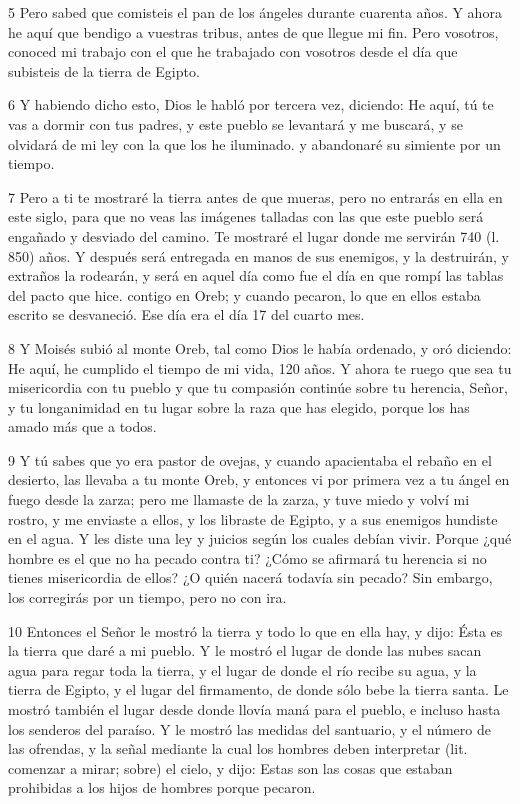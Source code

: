 \par 5 Pero sabed que comisteis el pan de los ángeles durante cuarenta años. Y ahora he aquí que bendigo a vuestras tribus, antes de que llegue mi fin. Pero vosotros, conoced mi trabajo con el que he trabajado con vosotros desde el día que subisteis de la tierra de Egipto.

\par 6 Y habiendo dicho esto, Dios le habló por tercera vez, diciendo: He aquí, tú te vas a dormir con tus padres, y este pueblo se levantará y me buscará, y se olvidará de mi ley con la que los he iluminado. y abandonaré su simiente por un tiempo.

\par 7 Pero a ti te mostraré la tierra antes de que mueras, pero no entrarás en ella en este siglo, para que no veas las imágenes talladas con las que este pueblo será engañado y desviado del camino. Te mostraré el lugar donde me servirán 740 (l. 850) años. Y después será entregada en manos de sus enemigos, y la destruirán, y extraños la rodearán, y será en aquel día como fue el día en que rompí las tablas del pacto que hice. contigo en Oreb; y cuando pecaron, lo que en ellos estaba escrito se desvaneció. Ese día era el día 17 del cuarto mes.

\par 8 Y Moisés subió al monte Oreb, tal como Dios le había ordenado, y oró diciendo: He aquí, he cumplido el tiempo de mi vida, 120 años. Y ahora te ruego que sea tu misericordia con tu pueblo y que tu compasión continúe sobre tu herencia, Señor, y tu longanimidad en tu lugar sobre la raza que has elegido, porque los has amado más que a todos.

\par 9 Y tú sabes que yo era pastor de ovejas, y cuando apacientaba el rebaño en el desierto, las llevaba a tu monte Oreb, y entonces vi por primera vez a tu ángel en fuego desde la zarza; pero me llamaste de la zarza, y tuve miedo y volví mi rostro, y me enviaste a ellos, y los libraste de Egipto, y a sus enemigos hundiste en el agua. Y les diste una ley y juicios según los cuales debían vivir. Porque ¿qué hombre es el que no ha pecado contra ti? ¿Cómo se afirmará tu herencia si no tienes misericordia de ellos? ¿O quién nacerá todavía sin pecado? Sin embargo, los corregirás por un tiempo, pero no con ira.

\par 10 Entonces el Señor le mostró la tierra y todo lo que en ella hay, y dijo: Ésta es la tierra que daré a mi pueblo. Y le mostró el lugar de donde las nubes sacan agua para regar toda la tierra, y el lugar de donde el río recibe su agua, y la tierra de Egipto, y el lugar del firmamento, de donde sólo bebe la tierra santa. Le mostró también el lugar desde donde llovía maná para el pueblo, e incluso hasta los senderos del paraíso. Y le mostró las medidas del santuario, y el número de las ofrendas, y la señal mediante la cual los hombres deben interpretar (lit. comenzar a mirar; sobre) el cielo, y dijo: Estas son las cosas que estaban prohibidas a los hijos de hombres porque pecaron.

